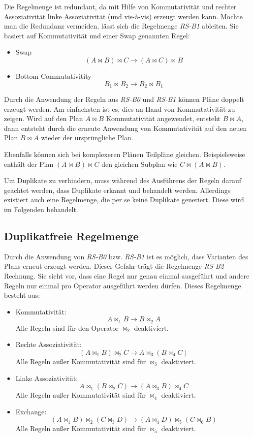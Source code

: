 Die Regelmenge ist redundant, da mit Hilfe von Kommutativität und rechter Assoziativität linke Assoziativität (und vis-à-vis) erzeugt werden kann. Möchte man die Redundanz vermeiden, lässt sich die Regelmenge \textit{RS-B1} ableiten. Sie basiert auf Kommutativität und einer Swap genannten Regel:

\begin{itemize}
\item Swap $$ (A \Join B) \Join C \to (A \Join C) \Join B $$
\item Bottom Commutativitity $$ B_1 \Join B_2 \to B_2 \Join B_1$$
\end{itemize}



Durch die Anwendung der Regeln aus \textit{RS-B0} und \textit{RS-B1} können Pläne doppelt erzeugt werden. Am einfachsten ist es, dies an Hand von Kommutativität zu zeigen. Wird auf den Plan $A \Join B$ Kommutativität angewendet, entsteht $B \Join A$, dann entsteht durch die erneute Anwendung von Kommutativität auf den neuen Plan $B \Join A$ wieder der ursprüngliche Plan.

Ebenfalls können sich bei komplexeren Plänen  Teilpläne gleichen. Beispielsweise enthält der Plan $(A \Join B) \Join C$ den gleichen Subplan wie $C \Join (A \Join B)$.

Um Duplikate zu verhindern, muss während des Ausführens der Regeln darauf geachtet werden, dass Duplikate erkannt und behandelt werden. Allerdings existiert auch eine Regelmenge, die per se keine Duplikate generiert. Diese wird im Folgenden behandelt.



\subsection{Duplikatfreie Regelmenge}
Durch die Anwendung von \textit{RS-B0} bzw. \textit{RS-B1} ist es möglich, dass Varianten des Plans erneut erzeugt werden. Dieser Gefahr trägt die Regelmenge \textit{RS-B2} Rechnung. Sie sieht vor, dass eine Regel nur genau einmal ausgeführt und andere Regeln nur einmal pro Operator ausgeführt werden dürfen. Dieses Regelmenge besteht aus:


\begin{itemize}
\item Kommutativität: $$ A \Join_1 B \to B \Join_2 A$$
Alle Regeln sind für den Operator $\Join_2$ deaktiviert.
\item Rechte Assoziativität: $$(A \Join_1 B) \Join_2 C \to A \Join_3 (B \Join_4 C) $$
Alle Regeln außer Kommutativität sind für $\Join_3$ deaktiviert.
\item Linke Assoziativität: $$A \Join_1 (B \Join_2 C) \to (A \Join_3 B) \Join_4 C$$
Alle Regeln außer Kommutativität sind für $\Join_4$ deaktiviert.

\item Exchange: $$(A \Join_1 B) \Join_2 (C \Join_3 D) \to (A \Join_4 D) \Join_5 (C \Join_6 B) $$
Alle Regeln außer Kommutativität sind für $\Join_5$ deaktiviert.
\end{itemize}

